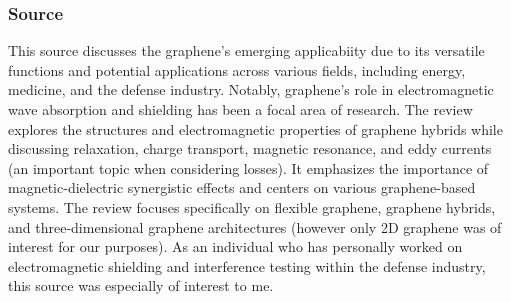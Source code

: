 \documentclass[conference]{IEEEtran}
\begin{document}
\subsubsection{Source \cite{mb5}}

This source discusses the graphene's emerging applicabiity due to its versatile functions and potential applications across various fields, including energy, medicine, and the defense industry. Notably, graphene's role in electromagnetic wave absorption and shielding has been a focal area of research. The review explores the structures and electromagnetic properties of graphene hybrids while discussing relaxation, charge transport, magnetic resonance, and eddy currents (an important topic when considering losses). It emphasizes the importance of magnetic-dielectric synergistic effects and centers on various graphene-based systems. The review focuses specifically on flexible graphene, graphene hybrids, and three-dimensional graphene architectures (however only 2D graphene was of interest for our purposes). As an individual who has personally worked on electromagnetic shielding and interference testing within the defense industry, this source was especially of interest to me.
\end{document}
